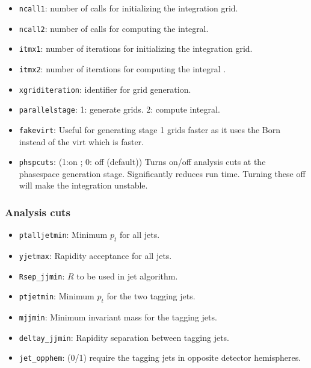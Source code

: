 \documentclass[12pt,a4]{article}
\begin{document}
\begin{itemize}
\item\texttt{ncall1}: number of calls for initializing the integration grid.
  
\item\texttt{ncall2}: number of calls for computing the integral.
  
\item\texttt{itmx1}: number of iterations for initializing the
  integration grid.
  
\item\texttt{itmx2}: number of iterations for computing the integral .
  
\item\texttt{xgriditeration}: identifier for grid generation.
  
\item\texttt{parallelstage}: 1: generate grids. 2: compute integral.

\item\texttt{fakevirt}: Useful for generating stage 1 grids faster as
  it uses the Born instead of the virt which is faster.

\item\texttt{phspcuts}: (1:on ; 0: off (default)) Turns on/off analysis
  cuts at the phasespace generation stage. Significantly reduces run
  time. Turning these off will make the integration unstable.
\end{itemize}

\subsubsection{Analysis cuts}
\begin{itemize}
\item\texttt{ptalljetmin}: Minimum $p_t$ for all jets.

\item\texttt{yjetmax}: Rapidity acceptance for all jets.

\item\texttt{Rsep\_jjmin}: $R$ to be used in jet algorithm.

\item\texttt{ptjetmin}: Minimum $p_t$ for the two tagging jets.

\item\texttt{mjjmin}: Minimum invariant mass for the tagging jets.

\item\texttt{deltay\_jjmin}: Rapidity separation between tagging jets.

\item\texttt{jet\_opphem}: (0/1) require the tagging jets in opposite
  detector hemispheres.
\end{itemize}
\end{document}
